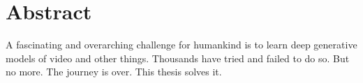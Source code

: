 
\chapter{Abstract}

A fascinating and overarching challenge for humankind is to learn deep generative models of video and other things. Thousands have tried and failed to do so. But no more. The journey is over. This thesis solves it.

